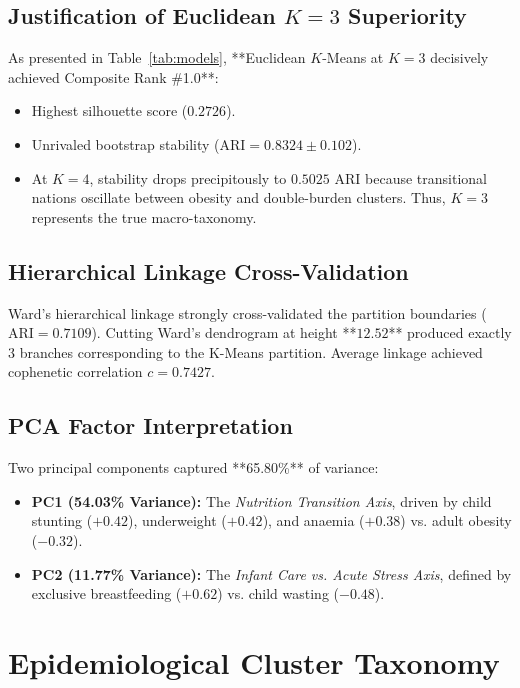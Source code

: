 \documentclass[conference]{IEEEtran}
\begin{document}
\subsection{Justification of Euclidean $K=3$ Superiority}
As presented in Table~\ref{tab:models}, **Euclidean $K$-Means at $K=3$ decisively achieved Composite Rank \#1.0**:
\begin{itemize}
    \item Highest silhouette score ($0.2726$).
    \item Unrivaled bootstrap stability ($\text{ARI} = 0.8324 \pm 0.102$).
    \item At $K=4$, stability drops precipitously to $0.5025$ $\text{ARI}$ because transitional nations oscillate between obesity and double-burden clusters. Thus, $K=3$ represents the true macro-taxonomy.
\end{itemize}

\subsection{Hierarchical Linkage Cross-Validation}
Ward's hierarchical linkage strongly cross-validated the partition boundaries ($\text{ARI} = 0.7109$). Cutting Ward's dendrogram at height **$12.52$** produced exactly 3 branches corresponding to the K-Means partition. Average linkage achieved cophenetic correlation $c = 0.7427$.

\subsection{PCA Factor Interpretation}
Two principal components captured **65.80\%** of variance:
\begin{itemize}
    \item \textbf{PC1 (54.03\% Variance):} The \textit{Nutrition Transition Axis}, driven by child stunting ($+0.42$), underweight ($+0.42$), and anaemia ($+0.38$) vs. adult obesity ($-0.32$).
    \item \textbf{PC2 (11.77\% Variance):} The \textit{Infant Care vs. Acute Stress Axis}, defined by exclusive breastfeeding ($+0.62$) vs. child wasting ($-0.48$).
\end{itemize}

\section{Epidemiological Cluster Taxonomy}
\end{document}
